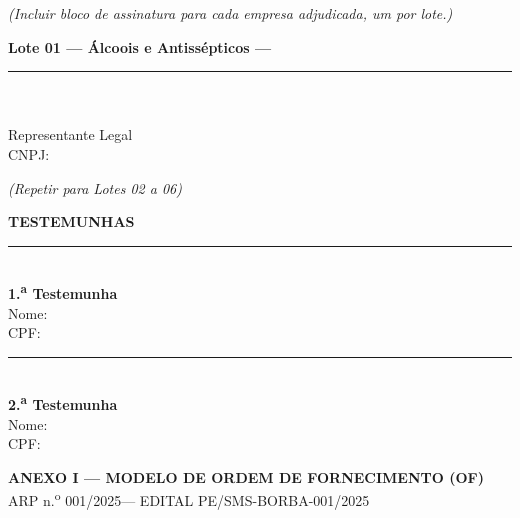 \documentclass[12pt,a4paper]{article}
\newcommand{\blank}[1]{\underline{\hspace{#1}}}
\newcommand{\assinatura}[3]{%
  \begin{center}\vspace{0.3cm}
  \rule{7.5cm}{0.5pt}\\[3pt]
  \textbf{#1}\\\small #2\\\small #3
  \end{center}}
\newcommand{\arpNum}{001}          %
\newcommand{\exercicio}{2025}
\newcommand{\editalRef}{EDITAL PE/SMS-BORBA-001/2025}
\begin{document}
\noindent\textit{(Incluir bloco de assinatura para cada empresa adjudicada,
um por lote.)}

\vspace{0.5cm}
\noindent\textbf{Lote 01 --- Álcoois e Antissépticos --- \blank{5cm}}

\begin{minipage}{0.47\linewidth}
\assinatura{\blank{5cm}}{Representante Legal}{CNPJ: \blank{3cm}}
\end{minipage}

\bigskip\noindent\textit{(Repetir para Lotes 02 a 06)}

\vspace{1.0cm}
\begin{center}\textbf{TESTEMUNHAS}\end{center}

\vspace{0.3cm}
\begin{minipage}{0.47\linewidth}
\assinatura{1.\textsuperscript{a} Testemunha}{Nome: \blank{4cm}}{CPF: \blank{3cm}}
\end{minipage}
\hfill
\begin{minipage}{0.47\linewidth}
\assinatura{2.\textsuperscript{a} Testemunha}{Nome: \blank{4cm}}{CPF: \blank{3cm}}
\end{minipage}

\clearpage
\begin{center}
  \textbf{\large\color{navy}ANEXO I --- MODELO DE ORDEM DE FORNECIMENTO (OF)}\\[4pt]
  {\normalsize ARP n.\textsuperscript{o} \arpNum/\exercicio --- \editalRef}
\end{center}
\end{document}
